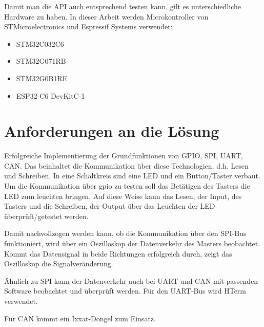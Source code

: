 Damit man die API auch entsprechend testen kann, gilt es unterschiedliche Hardware zu haben.
In dieser Arbeit werden Microkontroller von STMicroelectronics und Espressif Systems verwendet:

\begin{itemize}
	\item STM32C032C6
	\item STM32G071RB
	\item STM32G0B1RE
	\item ESP32-C6 DevKitC-1
\end{itemize}


\section{Anforderungen an die Lösung}
Erfolgreiche Implementierung der Grundfunktionen von GPIO, SPI, UART, CAN. 
Das beinhaltet die Kommunikation über diese Technologien, d.h. Lesen und Schreiben.
In eine Schaltkreis sind eine LED und ein Button/Taster verbaut. 
Um die Kommunikation über \gls{gpio} zu testen soll das Betätigen des Tasters die LED zum leuchten bringen.
Auf diese Weise kann das Lesen, der Input, des Tasters und die Schreiben, der Output über das Leuchten der LED überprüft/getestet werden.

Damit nachvollzogen werden kann, ob die Kommunikation über den SPI-Bus funktioniert, 
wird über ein Oszilloskop der Datenverkehr des Masters beobachtet. 
Kommt das Datensignal in beide Richtungen erfolgreich durch, zeigt das Oszilloskop die Signalveränderung.

Ähnlich zu SPI kann der Datenverkehr auch bei UART und CAN mit passenden Software beobachtet und überprüft werden.
Für den UART-Bus wird HTerm verwendet. %

Für CAN kommt ein Ixxat-Dongel zum Einsatz. %



























